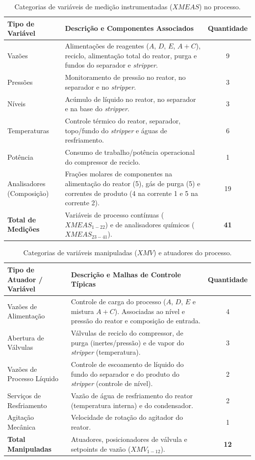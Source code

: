 \documentclass[journal]{IEEEtran}
\begin{document}
\begin{table}[!ht]
\centering
\caption{Categorias de variáveis de medição instrumentadas ($XMEAS$) no processo.}
\label{tab:xmeas_variables}
\small
\begin{tabular}{lp{8.5cm}c}
\toprule
\rowcolor{gray!20}
\textbf{Tipo de Variável} & \textbf{Descrição e Componentes Associados} & \textbf{Quantidade} \\
\midrule
Vazões & Alimentações de reagentes ($A$, $D$, $E$, $A+C$), reciclo, alimentação total do reator, purga e fundos do separador e \textit{stripper}. & 9 \\
Pressões & Monitoramento de pressão no reator, no separador e no \textit{stripper}. & 3 \\
Níveis & Acúmulo de líquido no reator, no separador e na base do \textit{stripper}. & 3 \\
Temperaturas & Controle térmico do reator, separador, topo/fundo do \textit{stripper} e águas de resfriamento. & 6 \\
Potência & Consumo de trabalho/potência operacional do compressor de reciclo. & 1 \\
Analisadores (Composição) & Frações molares de componentes na alimentação do reator (5), gás de purga (5) e correntes de produto (4 na corrente 1 e 5 na corrente 2). & 19 \\
\midrule
\textbf{Total de Medições} & Variáveis de processo contínuas ($XMEAS_{1-22}$) e de analisadores químicos ($XMEAS_{23-41}$). & \textbf{41} \\
\bottomrule
\end{tabular}
\end{table}

\begin{table}[!ht]
\centering
\caption{Categorias de variáveis manipuladas ($XMV$) e atuadores do processo.}
\label{tab:xmv_variables}
\small
\begin{tabular}{lp{8.5cm}c}
\toprule
\rowcolor{gray!20}
\textbf{Tipo de Atuador / Variável} & \textbf{Descrição e Malhas de Controle Típicas} & \textbf{Quantidade} \\
\midrule
Vazões de Alimentação & Controle de carga do processo ($A$, $D$, $E$ e mistura $A+C$). Associadas ao nível e pressão do reator e composição de entrada. & 4 \\
Abertura de Válvulas & Válvulas de reciclo do compressor, de purga (inertes/pressão) e de vapor do \textit{stripper} (temperatura). & 3 \\
Vazões de Processo Líquido & Controle de escoamento de líquido do fundo do separador e do produto do \textit{stripper} (controle de nível). & 2 \\
Serviços de Resfriamento & Vazão de água de resfriamento do reator (temperatura interna) e do condensador. & 2 \\
Agitação Mecânica & Velocidade de rotação do agitador do reator. & 1 \\
\midrule
\textbf{Total Manipuladas} & Atuadores, posicionadores de válvula e setpoints de vazão ($XMV_{1-12}$). & \textbf{12} \\
\bottomrule
\end{tabular}
\end{table}
\end{document}
